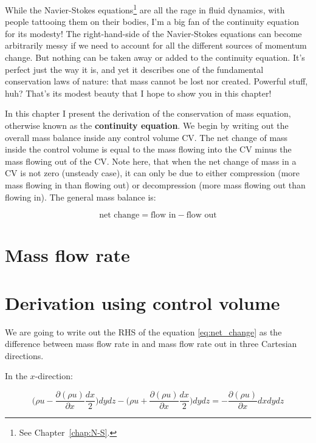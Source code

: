 While the Navier-Stokes equations\footnote{See Chapter~\ref{chap:N-S}.} are all the rage in fluid dynamics, with people tattooing them on their bodies, I'm a big fan of the continuity equation for its modesty! The right-hand-side of the Navier-Stokes equations can become arbitrarily messy if we need to account for all the different sources of momentum change. But nothing can be taken away or added to the continuity equation. It's perfect just the way it is, and yet it describes one of the fundamental conservation laws of nature: that mass cannot be lost nor created. Powerful stuff, huh? That's its modest beauty that I hope to show you in this chapter!

In this chapter I present the derivation of the conservation of mass equation, otherwise known as the \textbf{continuity equation}. We begin by writing out the overall mass balance inside any control volume CV. The net change of mass inside the control volume is equal to the mass flowing into the CV minus the mass flowing out of the CV. Note here, that when the net change of mass in a CV is not zero (unsteady case), it can only be due to either compression (more mass flowing in than flowing out) or decompression (more mass flowing out than flowing in). The general mass balance is:

\begin{equation} \label{eq:net_change}
\text{net change} = \text{flow in} - \text{flow out}
\end{equation}

\section{Mass flow rate}

\section{Derivation using control volume}

We are going to write out the RHS of the equation \ref{eq:net_change} as the difference between mass flow rate in and mass flow rate out in three Cartesian directions.

In the $x$-direction:

\begin{equation}
\Big( \rho u - \frac{\partial (\rho u)}{\partial x} \frac{dx}{2} \Big) dy dz - \Big( \rho u + \frac{\partial (\rho u)}{\partial x} \frac{dx}{2} \Big) dy dz = - \frac{\partial (\rho u)}{\partial x} dx dy dz
\end{equation}

